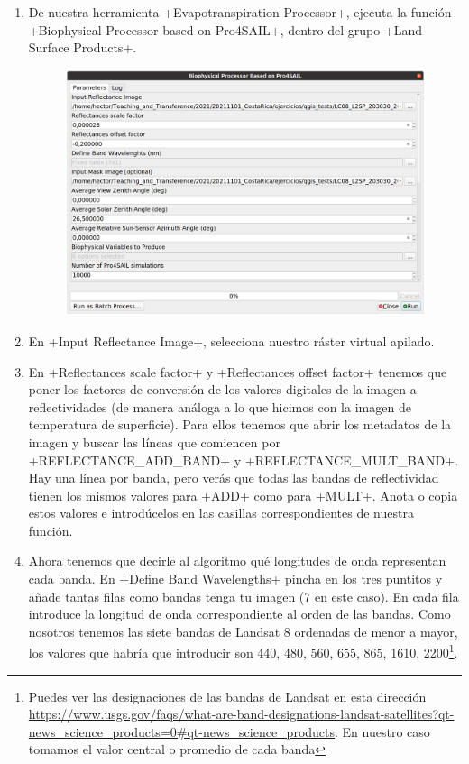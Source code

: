 \documentclass[a4paper,11pt]{article}
\begin{document}
      \begin{enumerate}
       \item De nuestra herramienta \cverb+Evapotranspiration Processor+, ejecuta la función \cverb+Biophysical Processor based on Pro4SAIL+, dentro del grupo \cverb+Land Surface Products+. 
       
       \begin{figure}[H]\centering
        \includegraphics[width=\textwidth]{qgis_biophysical_processor}
       \end{figure}
       
       \item En \cverb+Input Reflectance Image+, selecciona nuestro ráster virtual apilado.
       
       \item En \cverb+Reflectances scale factor+ y \cverb+Reflectances offset factor+ tenemos que poner los factores de conversión de los valores digitales de la imagen a reflectividades (de manera análoga a lo que hicimos con la imagen de temperatura de superficie). Para ellos tenemos que abrir los metadatos de la imagen y buscar las líneas que comiencen por \cverb+REFLECTANCE_ADD_BAND+ y \cverb+REFLECTANCE_MULT_BAND+. Hay una línea por banda, pero verás que todas las bandas de reflectividad tienen los mismos valores para \cverb+ADD+ como para \cverb+MULT+. Anota o copia estos valores e introdúcelos en las casillas correspondientes de nuestra función.
       
       \item Ahora tenemos que decirle al algoritmo qué longitudes de onda representan cada banda. En \cverb+Define Band Wavelengths+ pincha en los tres puntitos y añade tantas filas como bandas tenga tu imagen (7 en este caso). En cada fila introduce la longitud de onda correspondiente al orden de las bandas. Como nosotros tenemos las siete bandas de Landsat 8 ordenadas de menor a mayor, los valores que habría que introducir son 440, 480, 560, 655, 865, 1610, 2200\footnote{Puedes ver las designaciones de las bandas de Landsat en esta dirección \url{https://www.usgs.gov/faqs/what-are-band-designations-landsat-satellites?qt-news_science_products=0#qt-news_science_products}. En nuestro caso tomamos el valor central o promedio de cada banda}.
       

\end{enumerate}
\end{document}
